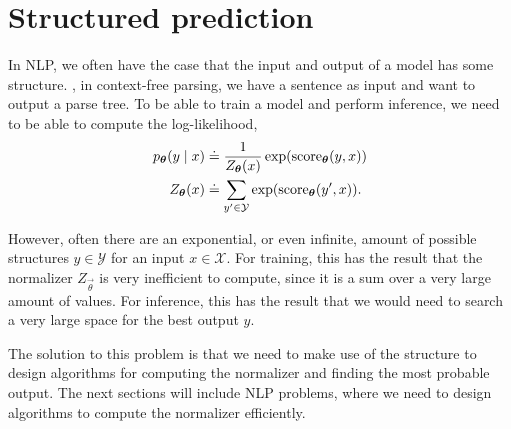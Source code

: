 \section{Structured prediction}

In NLP, we often have the case that the input and output of a model has some
structure. \Eg, in context-free parsing, we have a sentence as input and want
to output a parse tree. To be able to train a model and perform inference, we
need to be able to compute the log-likelihood,
\begin{align*}
  p_{\bm{\theta}}(y \mid x) &\doteq \frac{1}{Z_{\bm{\theta}}(x)} \exp(\mathrm{score}_{\bm{\theta}}(y,x)) \\
  Z_{\bm{\theta}}(x) &\doteq \sum_{y' \in \mathcal{Y}} \exp(\mathrm{score}_{\bm{\theta}}(y',x))
.\end{align*}

However, often there are an exponential, or even infinite, amount of possible
structures $y\in\mathcal{Y}$ for an input $x\in\mathcal{X}$. For training, this
has the result that the normalizer $Z_{\vec{\theta}}$ is very inefficient to
compute, since it is a sum over a very large amount of values. For inference,
this has the result that we would need to search a very large space for the
best output $y$.

The solution to this problem is that we need to make use of the structure to
design algorithms for computing the normalizer and finding the most probable
output. The next sections will include NLP problems, where we need to design
algorithms to compute the normalizer efficiently.
